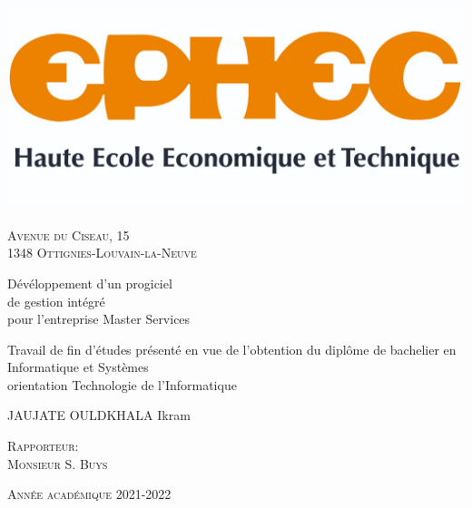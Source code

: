 \documentclass[french, 11pt, a4paper]{article}
\begin{document}
\singlespacing


\begin{titlepage}
\begin{center}

\includegraphics[width=15cm]{img/ephec.jpg}~\\
\textsc{Avenue du Ciseau, 15 \\ 1348 Ottignies-Louvain-la-Neuve} \\[1.5cm]

{\huge \bfseries \begin{spacing}{1.25}
  Dévéloppement d'un progiciel \\ 
  de gestion intégré \\
  pour l'entreprise Master Services
  \\[2cm]
  \end{spacing} 
} 

{\large 
  Travail de fin d’études présenté en vue de l’obtention du diplôme de bachelier en Informatique et Systèmes \\
  orientation Technologie de l’Informatique
  \\[2cm]
}

{\LARGE 
JAUJATE OULDKHALA Ikram
}

\vspace*{\fill}
  
\end{center}

\begin{minipage}[t]{.5\textwidth}
  \textsc{\large Rapporteur:\\Monsieur S. Buys}
\end{minipage}
\begin{minipage}[br]{.5\textwidth}
  \textsc{\large Année académique 2021-2022}
\end{minipage}  

\end{titlepage}
\end{document}
